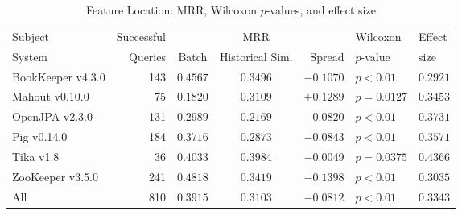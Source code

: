 \begin{table}[t]
\centering
\caption{Feature Location: MRR, Wilcoxon $p$-values, and effect size}
\begin{tabular}{l|r|ccr|ll}
\toprule
Subject & Successful &    & MRR &        & Wilcoxon  & Effect \\
System  & Queries    & Batch & Historical Sim.  & Spread & $p$-value & size \\
\midrule
BookKeeper v4.3.0 & 143 & $\bm{0.4567}$ & $0.3496$ & $-0.1070$ & $p < 0.01$ & $0.2921$ \\
Mahout v0.10.0 & 75 & $0.1820$ & $\bm{0.3109}$ & $+0.1289$ & $p = 0.0127$ & $0.3453$ \\
OpenJPA v2.3.0 & 131 & $\bm{0.2989}$ & $0.2169$ & $-0.0820$ & $p < 0.01$ & $0.3731$ \\
Pig v0.14.0 & 184 & $\bm{0.3716}$ & $0.2873$ & $-0.0843$ & $p < 0.01$ & $0.3571$ \\
Tika v1.8 & 36 & $\bm{0.4033}$ & $0.3984$ & $-0.0049$ & $p = 0.0375$ & $0.4366$ \\
ZooKeeper v3.5.0 & 241 & $\bm{0.4818}$ & $0.3419$ & $-0.1398$ & $p < 0.01$ & $0.3035$ \\
\midrule
All & 810 & $\bm{0.3915}$ & $0.3103$ & $-0.0812$ & $p < 0.01$ & $0.3343$ \\
\bottomrule
\end{tabular}
\label{table:feature_location_rq2}
\end{table}
